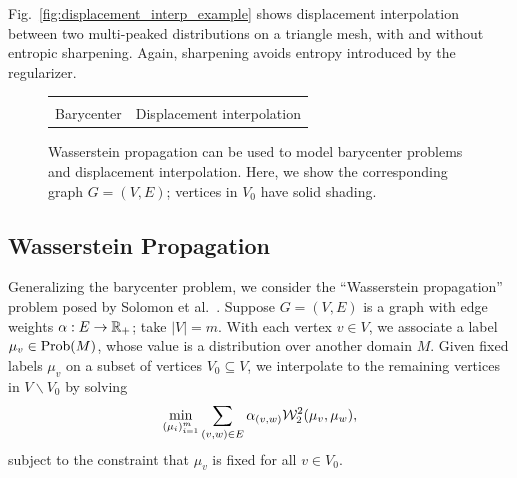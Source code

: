 Fig.~\ref{fig:displacement_interp_example} shows displacement interpolation between two multi-peaked distributions on a triangle mesh, with and without entropic sharpening.  Again, sharpening avoids entropy introduced by the regularizer.%


\begin{figure}[t]
\centering
\graphicspath{ {figures/propagation_special_cases/} }
\begin{tabular}{@{}cc@{}}
\def\svgwidth{.15\textwidth}&
\def\svgwidth{.15\textwidth}\\
Barycenter &
Displacement interpolation
\end{tabular}
\vspace{-2mm}
\caption{Wasserstein propagation can be used to model barycenter problems and displacement interpolation.  Here, we show the corresponding graph $G=(V,E)$; vertices in $V_0$ have solid shading.}
 \vspace{-3mm}
\label{fig:propagation_special_cases}
\end{figure}

\subsection{Wasserstein Propagation}\label{sec:propagation}

Generalizing the barycenter problem, we consider the ``Wasserstein propagation'' problem posed by Solomon et al.~.  Suppose $G=(V,E)$ is a graph with edge weights $\alpha:E\rightarrow \mathbb{R}_+$; take $|V|=m$.  With each vertex $v\in V$, we associate a label $\mu_v\in\mathrm{Prob}(M)$, whose value is a distribution over another domain $M$.  Given fixed labels $\mu_v$ on a subset of vertices $V_0\subseteq V$, we interpolate to the remaining vertices in $V\backslash V_0$ by solving\vspace{-2mm}
$$\min_{(\mu_i)_{i=1}^m}\sum_{(v,w)\in E} \alpha_{(v,w)}\W_2^2(\mu_v,\mu_w),\vspace{-2mm}$$
subject to the constraint that $\mu_v$ is fixed for all $v\in V_0.$

